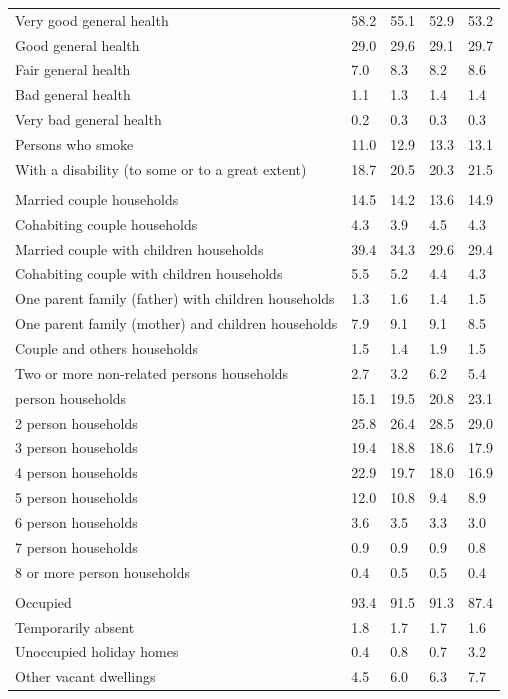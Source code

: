 \documentclass{article}
\begin{document}
\begin{table}[h]
\begin{tabular}{KTTTT}
    \hline
Very good general health & 58.2& 55.1&52.9& 53.2\\
Good general health & 29.0& 29.6& 29.1& 29.7\\
Fair general health & 7.0& 8.3&8.2& 8.6\\
Bad general health & 1.1& 1.3&1.4& 1.4\\
Very bad general health & 0.2& 0.3&0.3& 0.3\\
    \hline
Persons who smoke & 11.0& 12.9&13.3& 13.1\\
    \hline
With a disability (to some or to a great extent) & 18.7& 20.5&20.3& 21.5\\
\hline
    \\ 
    \hline
Married couple households & 14.5& 14.2& 13.6& 14.9\\
Cohabiting couple households & 4.3& 3.9& 4.5& 4.3\\
Married couple with children households & 39.4& 34.3& 29.6& 29.4\\
Cohabiting couple with children households & 5.5& 5.2& 4.4& 4.3\\
One parent family (father) with  children households & 1.3& 1.6& 1.4& 1.5\\
One parent family (mother) and children households & 7.9& 9.1& 9.1& 8.5\\
Couple and others households  & 1.5& 1.4& 1.9& 1.5\\
Two or more non-related persons households & 2.7& 3.2& 6.2& 5.4\\
     person households & 15.1& 19.5& 20.8& 23.1\\
2 person households & 25.8& 26.4& 28.5& 29.0\\
3 person households & 19.4& 18.8& 18.6& 17.9\\
4 person households & 22.9& 19.7& 18.0& 16.9\\
5 person households & 12.0& 10.8&  9.4&  8.9\\
6 person households & 3.6& 3.5& 3.3& 3.0\\
7 person households & 0.9& 0.9& 0.9& 0.8\\
8 or more person households & 0.4& 0.5& 0.5& 0.4\\
\hline
    \\ 
    \hline
Occupied & 93.4& 91.5& 91.3& 87.4\\
Temporarily absent & 1.8& 1.7& 1.7& 1.6\\
Unoccupied holiday homes & 0.4& 0.8& 0.7& 3.2\\
Other vacant dwellings & 4.5& 6.0& 6.3& 7.7\\
\hline
\end{tabular}
\end{table}
\end{document}

